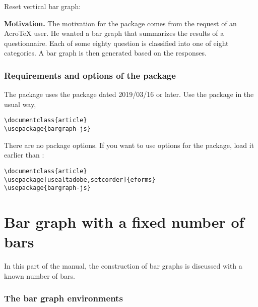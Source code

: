 \documentclass{article}
\edef\amtIndent{\the\parindent}
\begin{document}
Reset vertical bar graph:
  \vcgBdry[6bp]

\textbf{Motivation.} The motivation for the package comes from the request of
an {Acro\negthinspace\TeX} user. He wanted a bar graph that summarizes the
results of a questionnaire. Each of some eighty question is classified into
one of eight categories. A bar graph is then generated based on the
responses.

\section{Requirements and options of the package}

The  package uses the  package
dated 2019/03/16 or later. Use the package in the usual way,
\begin{Verbatim}[xleftmargin=\amtIndent,commandchars=!()]
\documentclass{article}
\usepackage{bargraph-js}
\end{Verbatim}
There are no package options. If you want to use options for the  package, load
it earlier than :
\begin{Verbatim}[xleftmargin=\amtIndent,commandchars=!()]
\documentclass{article}
\usepackage[usealtadobe,setcorder]{eforms}
\usepackage{bargraph-js}
\end{Verbatim}

\part{Bar graph with a fixed number of bars}

In this part of the manual, the construction of bar graphs is discussed with a known number
of bars.

\section{The bar graph environments}
\end{document}
